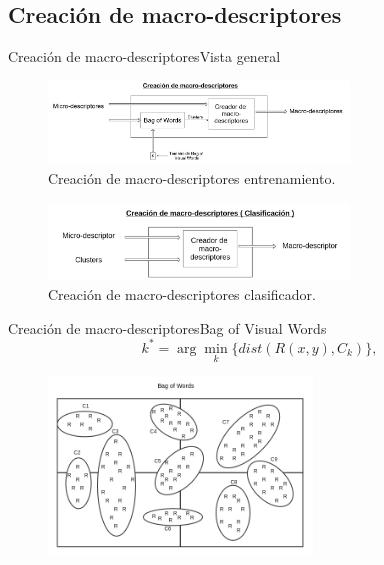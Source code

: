 \documentclass{beamer}
\begin{document}
    \subsection{Creación de macro-descriptores}
		\begin{frame}{Creación de macro-descriptores}{Vista general}
            \begin{figure}[bt]
        		\centering
                \includegraphics[width=8cm]{imagenes/Extractor_macrodescriptores_entrenamiento.png}
          		\caption{Creación de macro-descriptores entrenamiento.}
            \end{figure}
            
            \begin{figure}[bt]
        		\centering
                \includegraphics[width=8cm]{imagenes/Extractor_macrodescriptores_clasificacion.png}
          		\caption{Creación de macro-descriptores clasificador.}
            \end{figure}
        \end{frame}
        
        
        \begin{frame}{Creación de macro-descriptores}{Bag of Visual Words}
            \begin{equation}
  				\label{algoritmo:eq:dist}
				k^* = \arg \min_k \{\mathit{dist}(R(x,y),C_k)\},
			\end{equation}
            \begin{figure}[bt]
        		\centering
                \includegraphics[width=7cm]{imagenes/bow_solo.png}
            \end{figure}
        \end{frame}
        
\end{document}

